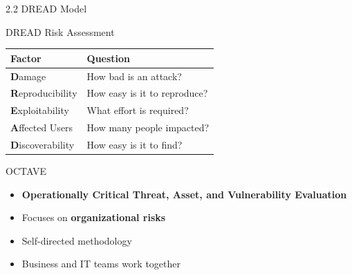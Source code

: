 \documentclass[9pt]{beamer}  %
\begin{document}
	\begin{frame}{2.2 DREAD Model}
		\begin{block}{DREAD Risk Assessment}
			\begin{tabular}{|p{2.5cm}|p{8.5cm}|}
				\hline
				\textbf{Factor} & \textbf{Question} \\
				\hline
				\textbf{D}amage & How bad is an attack? \\
				\hline
				\textbf{R}eproducibility & How easy is it to reproduce? \\
				\hline
				\textbf{E}xploitability & What effort is required? \\
				\hline
				\textbf{A}ffected Users & How many people impacted? \\
				\hline
				\textbf{D}iscoverability & How easy is it to find? \\
				\hline
			\end{tabular}
		\end{block}
		
		\begin{block}{OCTAVE}
			\begin{itemize}
				\item \textbf{Operationally Critical Threat, Asset, and Vulnerability Evaluation}
				\item Focuses on \textbf{organizational risks}
				\item Self-directed methodology
				\item Business and IT teams work together
			\end{itemize}
		\end{block}
	\end{frame}
	
\end{document}
